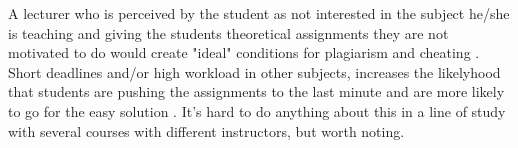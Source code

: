 \documentclass[12pt,a4paper]{article}
\begin{document}
A lecturer who is perceived by the student as not interested in the subject he/she is teaching and giving the students theoretical assignments they are not motivated to do would create "ideal" conditions for plagiarism and cheating \cite{Comas-Forgas2010}. Short deadlines and/or high workload in other subjects, increases the likelyhood that students are pushing the assignments to the last minute and are more likely to go for the easy solution \cite{Comas-Forgas2010}. It's hard to do anything about this in a line of study with several courses with different instructors, but worth noting.
\\ \\

\end{document}
